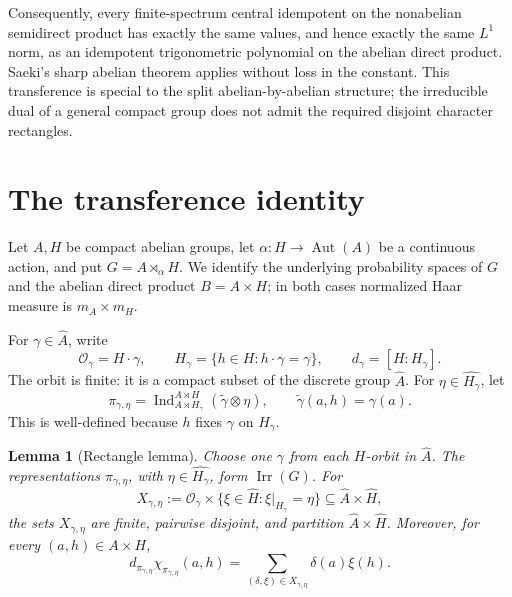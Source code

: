 \documentclass[11pt]{article}
\newtheorem{lemma}[theorem]{Lemma}
\newcommand{\Irr}{\operatorname{Irr}}
\newcommand{\1}{\mathbf 1}
\begin{document}
Consequently, every finite-spectrum central idempotent on the nonabelian semidirect
product has exactly the same values, and hence exactly the same $L^1$ norm, as an
idempotent trigonometric polynomial on the abelian direct product.  Saeki's sharp
abelian theorem applies without loss in the constant.  This transference is special
to the split abelian-by-abelian structure; the irreducible dual of a general compact
group does not admit the required disjoint character rectangles.

\section{The transference identity}

Let $A,H$ be compact abelian groups, let $\alpha:H\to\operatorname{Aut}(A)$ be a
continuous action, and put $G=A\rtimes_\alpha H$.  We identify the underlying
probability spaces of $G$ and the abelian direct product $B=A\times H$; in both cases
normalized Haar measure is $m_A\times m_H$.

For $\gamma\in\widehat A$, write
\[
 \mathcal O_\gamma=H\cdot\gamma,
 \qquad H_\gamma=\{h\in H:h\cdot\gamma=\gamma\},
 \qquad d_\gamma=[H:H_\gamma].
\]
The orbit is finite: it is a compact subset of the discrete group $\widehat A$.
For $\eta\in\widehat{H_\gamma}$, let
\[
 \pi_{\gamma,\eta}
 =\operatorname{Ind}_{A\rtimes H_\gamma}^{A\rtimes H}(\widetilde\gamma\otimes\eta),
 \qquad \widetilde\gamma(a,h)=\gamma(a).
\]
This is well-defined because $h$ fixes $\gamma$ on $H_\gamma$.

\begin{lemma}[Rectangle lemma]\label{lem:rectangle}
Choose one $\gamma$ from each $H$-orbit in $\widehat A$.  The representations
$\pi_{\gamma,\eta}$, with $\eta\in\widehat{H_\gamma}$, form $\Irr(G)$.
For
\[
 X_{\gamma,\eta}:=\mathcal O_\gamma\times
 \{\xi\in\widehat H:\xi|_{H_\gamma}=\eta\}
 \subseteq\widehat A\times\widehat H,
\]
the sets $X_{\gamma,\eta}$ are finite, pairwise disjoint, and partition
$\widehat A\times\widehat H$.  Moreover, for every $(a,h)\in A\times H$,
\begin{equation}\label{eq:rectangle}
 d_{\pi_{\gamma,\eta}}\chi_{\pi_{\gamma,\eta}}(a,h)
 =\sum_{(\delta,\xi)\in X_{\gamma,\eta}}\delta(a)\xi(h).
\end{equation}
\end{lemma}
\end{document}
